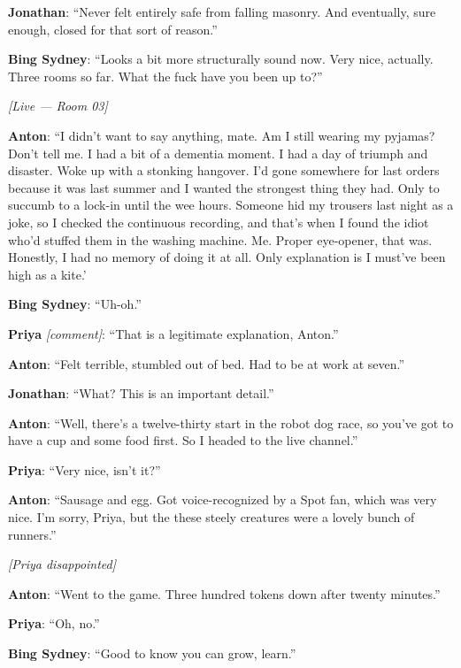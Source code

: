 \noindent\textbf{Jonathan}: ``Never felt entirely safe from falling masonry. And eventually, sure enough, closed for that sort of reason.''

\noindent\textbf{Bing Sydney}: ``Looks a bit more structurally sound now. Very nice, actually. Three rooms so far. What the fuck have you been up to?''

\medskip
\begin{center}
{\small\sffamily\color{nullmesh-ghost}\textit{[Live --- Room 03]}}
\end{center}
\medskip

\noindent\textbf{Anton}: ``I didn't want to say anything, mate. Am I still wearing my pyjamas? Don't tell me. I had a bit of a dementia moment. I had a day of triumph and disaster. Woke up with a stonking hangover. I'd gone somewhere for last orders because it was last summer and I wanted the strongest thing they had. Only to succumb to a lock-in until the wee hours. Someone hid my trousers last night as a joke, so I checked the continuous recording, and that's when I found the idiot who'd stuffed them in the washing machine. Me. Proper eye-opener, that was. Honestly, I had no memory of doing it at all. Only explanation is I must've been high as a kite.'

\noindent\textbf{Bing Sydney}: ``Uh-oh.''

\noindent\textbf{Priya} \textit{[comment]}: ``That is a legitimate explanation, Anton.''

\noindent\textbf{Anton}: ``Felt terrible, stumbled out of bed. Had to be at work at seven.''

\noindent\textbf{Jonathan}: ``What? This is an important detail.''

\noindent\textbf{Anton}: ``Well, there's a twelve-thirty start in the robot dog race, so you've got to have a cup and some food first. So I headed to the live channel.''

\noindent\textbf{Priya}: ``Very nice, isn't it?''

\noindent\textbf{Anton}: ``Sausage and egg. Got voice-recognized by a Spot fan, which was very nice. I'm sorry, Priya, but the these steely creatures were a lovely bunch of runners.''

\noindent\textit{[Priya disappointed]}

\noindent\textbf{Anton}: ``Went to the game. Three hundred tokens down after twenty minutes.''

\noindent\textbf{Priya}: ``Oh, no.''

\noindent\textbf{Bing Sydney}: ``Good to know you can grow, learn.''

